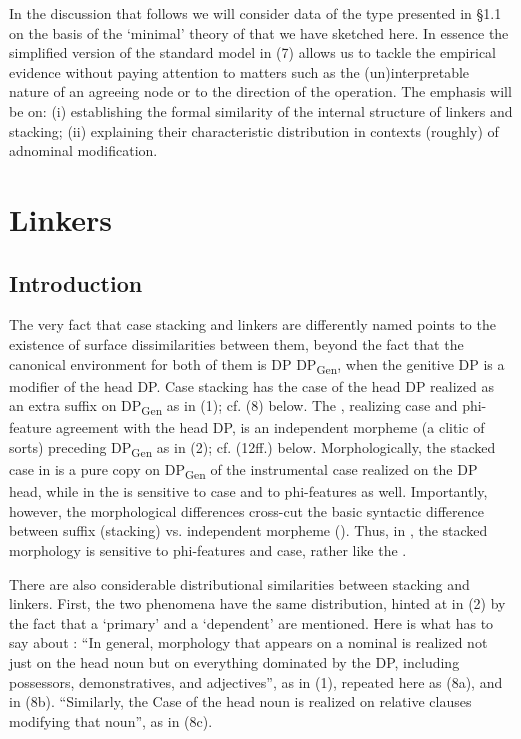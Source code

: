 \documentclass[output=paper]{langsci/langscibook}
\begin{document}
  In the discussion that follows we will consider data of the type presented in §1.1 on the basis of the ‘minimal’ theory of  that we have sketched here. In essence the simplified version of the standard model in (7) allows us to tackle the empirical evidence without paying attention to matters such as the (un)interpretable nature of an agreeing node or to the direction of the  operation. The emphasis will be on: (i) establishing the formal similarity of the internal structure of linkers and stacking; (ii) explaining their characteristic distribution in contexts (roughly) of adnominal modification.   

\section{Linkers} %

\subsection{Introduction}%

The very fact that case stacking and linkers are differently named points to the existence of surface dissimilarities between them, beyond the fact that the canonical environment for both of them is DP DP\textsubscript{Gen}, when the genitive DP is a modifier of the head DP. Case stacking has the case of the head DP realized as an extra suffix on DP\textsubscript{Gen} as in  (1); cf. (8) below. The , realizing case and phi-feature agreement with the head DP, is an independent morpheme (a clitic of sorts) preceding DP\textsubscript{Gen} as in  (2); cf. (12ff.) below. Morphologically, the stacked case in  is a pure copy on DP\textsubscript{Gen} of the instrumental case realized on the DP head, while in  the  is sensitive to case and to phi-features as well. Importantly, however, the morphological differences cross-cut the basic syntactic difference between suffix (stacking) vs. independent morpheme (). Thus, in , the stacked morphology is sensitive to phi-features and case, rather like the  .  

  There are also considerable distributional similarities between stacking and linkers. First, the two phenomena have the same distribution, hinted at in (2) by the fact that a ‘primary’ and a ‘dependent’ are mentioned. Here is what \citet[46--47]{Richards2013} has to say about : “In general, morphology that appears on a nominal is realized not just on the head noun but on everything dominated by the DP, including possessors, demonstratives, and adjectives”, as in (1), repeated here as (8a), and in (8b). “Similarly, the Case of the head noun is realized on relative clauses modifying that noun”, as in (8c).  
\end{document}

